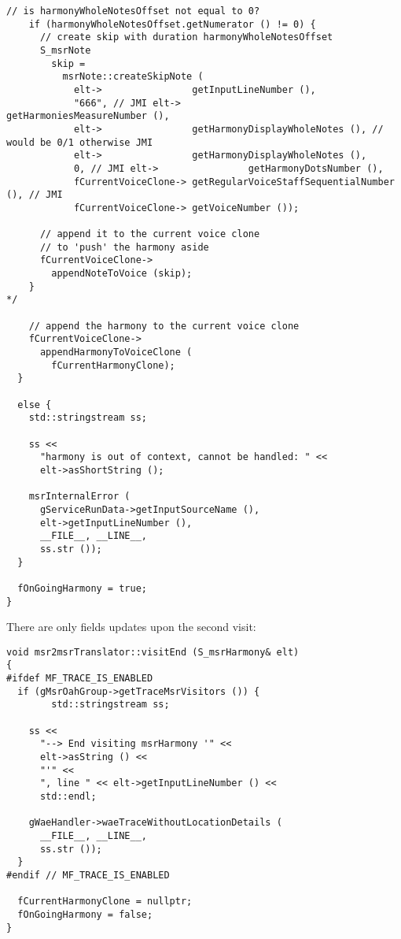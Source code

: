 \begin{lstlisting}[language=CPlusPlus]
    // is harmonyWholeNotesOffset not equal to 0?
    if (harmonyWholeNotesOffset.getNumerator () != 0) {
      // create skip with duration harmonyWholeNotesOffset
      S_msrNote
        skip =
          msrNote::createSkipNote (
            elt->                getInputLineNumber (),
            "666", // JMI elt->                getHarmoniesMeasureNumber (),
            elt->                getHarmonyDisplayWholeNotes (), // would be 0/1 otherwise JMI
            elt->                getHarmonyDisplayWholeNotes (),
            0, // JMI elt->                getHarmonyDotsNumber (),
            fCurrentVoiceClone-> getRegularVoiceStaffSequentialNumber (), // JMI
            fCurrentVoiceClone-> getVoiceNumber ());

      // append it to the current voice clone
      // to 'push' the harmony aside
      fCurrentVoiceClone->
        appendNoteToVoice (skip);
    }
*/

    // append the harmony to the current voice clone
    fCurrentVoiceClone->
      appendHarmonyToVoiceClone (
        fCurrentHarmonyClone);
  }

  else {
    std::stringstream ss;

    ss <<
      "harmony is out of context, cannot be handled: " <<
      elt->asShortString ();

    msrInternalError (
      gServiceRunData->getInputSourceName (),
      elt->getInputLineNumber (),
      __FILE__, __LINE__,
      ss.str ());
  }

  fOnGoingHarmony = true;
}
\end{lstlisting}

There are only fields updates upon the second visit:
\begin{lstlisting}[language=CPlusPlus]
void msr2msrTranslator::visitEnd (S_msrHarmony& elt)
{
#ifdef MF_TRACE_IS_ENABLED
  if (gMsrOahGroup->getTraceMsrVisitors ()) {
		std::stringstream ss;

    ss <<
      "--> End visiting msrHarmony '" <<
      elt->asString () <<
      "'" <<
      ", line " << elt->getInputLineNumber () <<
      std::endl;

    gWaeHandler->waeTraceWithoutLocationDetails (
      __FILE__, __LINE__,
      ss.str ());
  }
#endif // MF_TRACE_IS_ENABLED

  fCurrentHarmonyClone = nullptr;
  fOnGoingHarmony = false;
}
\end{lstlisting}


